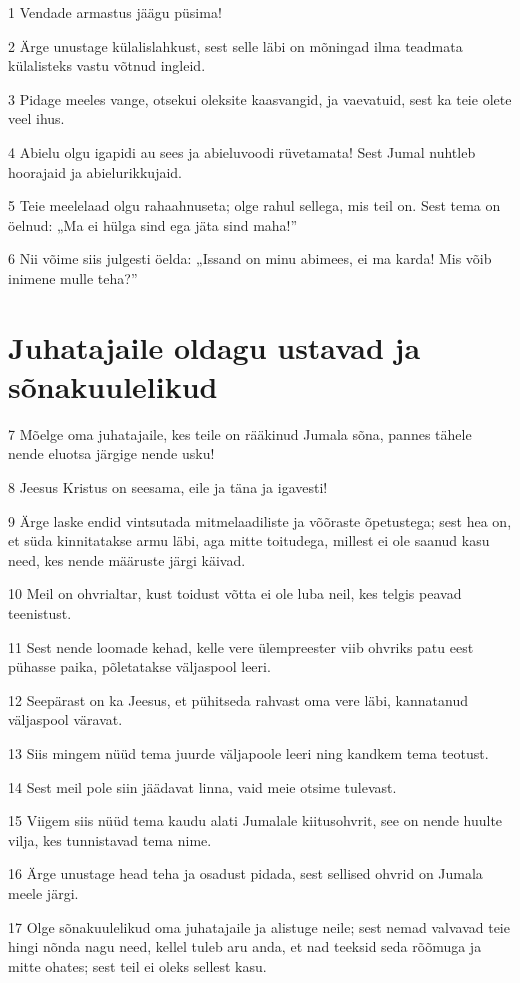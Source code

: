 \par 1 Vendade armastus jäägu püsima!
\par 2 Ärge unustage külalislahkust, sest selle läbi on mõningad ilma teadmata külalisteks vastu võtnud ingleid.
\par 3 Pidage meeles vange, otsekui oleksite kaasvangid, ja vaevatuid, sest ka teie olete veel ihus.
\par 4 Abielu olgu igapidi au sees ja abieluvoodi rüvetamata! Sest Jumal nuhtleb hoorajaid ja abielurikkujaid.
\par 5 Teie meelelaad olgu rahaahnuseta; olge rahul sellega, mis teil on. Sest tema on öelnud: „Ma ei hülga sind ega jäta sind maha!”
\par 6 Nii võime siis julgesti öelda: „Issand on minu abimees, ei ma karda! Mis võib inimene mulle teha?”

\section*{Juhatajaile oldagu ustavad ja sõnakuulelikud}

\par 7 Mõelge oma juhatajaile, kes teile on rääkinud Jumala sõna, pannes tähele nende eluotsa järgige nende usku!
\par 8 Jeesus Kristus on seesama, eile ja täna ja igavesti!
\par 9 Ärge laske endid vintsutada mitmelaadiliste ja võõraste õpetustega; sest hea on, et süda kinnitatakse armu läbi, aga mitte toitudega, millest ei ole saanud kasu need, kes nende määruste järgi käivad.
\par 10 Meil on ohvrialtar, kust toidust võtta ei ole luba neil, kes telgis peavad teenistust.
\par 11 Sest nende loomade kehad, kelle vere ülempreester viib ohvriks patu eest pühasse paika, põletatakse väljaspool leeri.
\par 12 Seepärast on ka Jeesus, et pühitseda rahvast oma vere läbi, kannatanud väljaspool väravat.
\par 13 Siis mingem nüüd tema juurde väljapoole leeri ning kandkem tema teotust.
\par 14 Sest meil pole siin jäädavat linna, vaid meie otsime tulevast.
\par 15 Viigem siis nüüd tema kaudu alati Jumalale kiitusohvrit, see on nende huulte vilja, kes tunnistavad tema nime.
\par 16 Ärge unustage head teha ja osadust pidada, sest sellised ohvrid on Jumala meele järgi.
\par 17 Olge sõnakuulelikud oma juhatajaile ja alistuge neile; sest nemad valvavad teie hingi nõnda nagu need, kellel tuleb aru anda, et nad teeksid seda rõõmuga ja mitte ohates; sest teil ei oleks sellest kasu.

